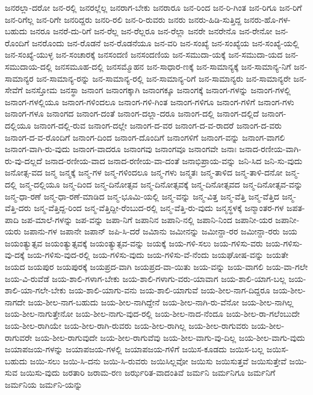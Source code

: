 {ಜನರಲ್ಲಾ-ದರೋ
ಜನ-ರಲ್ಲಿ
ಜನರಲ್ಲೆಲ್ಲ
ಜನರಾಗ-ಬೇಕು
ಜನರಾರೂ
ಜನ-ರಿಂದ
ಜನ-ರಿ-ಗಿಂತ
ಜನ-ರಿಗೂ
ಜನ-ರಿಗೆ
ಜನ-ರಿಗೆಲ್ಲ
ಜನ-ರಿಗೇ
ಜನರಿದ್ದರು
ಜನರಿ-ರಲಿ
ಜನ-ರಿ-ರುವರು
ಜನರು
ಜನರು-ಹಿಡಿ-ಸುತ್ತಿದ್ದ
ಜನರು-ಹೊ-ಗಳ-ಬಹುದು
ಜನರೂ
ಜನರೆ-ದು-ರಿಗೆ
ಜನ-ರೆಲ್ಲ
ಜನ-ರೆಲ್ಲರೂ
ಜನ-ರೆಲ್ಲಾ
ಜನರೇ
ಜನರೇನೊ
ಜನ-ರೇನೋ
ಜನ-ರೊಂದಿಗೆ
ಜನರೊಂದು
ಜನ-ರೊಡನೆ
ಜನ-ರೊಡನೆಯೂ
ಜನ-ವರಿ
ಜನ-ಸಂಖ್ಯೆ
ಜನ-ಸಂಖ್ಯೆಯ
ಜನ-ಸಂಖ್ಯೆ-ಯಲ್ಲಿ
ಜನ-ಸಂಖ್ಯೆ-ಯುಳ್ಳ
ಜನ-ಸಂಚಾರಕ್ಕೆ
ಜನಸಂದಣಿ
ಜನಸಂದಣಿಯ
ಜನ-ಸಮುದಾ-ಯಕ್ಕೆ
ಜನ-ಸಮುದಾ-ಯದ
ಜನ-ಸಮುದಾಯ-ದಲ್ಲಿ
ಜನಸಮೂಹ-ದಲ್ಲಿ
ಜನಸಮ್ಮೊಹನ
ಜನ-ಸಾಧಾರ-ಣಕ್ಕೆ
ಜನ-ಸಾಮಾನ್ಯಕ್ಕೆ
ಜನ-ಸಾಮಾನ್ಯ-ನಿಗೆ
ಜನ-ಸಾಮಾನ್ಯರ
ಜನ-ಸಾಮಾನ್ಯ-ರನ್ನು
ಜನ-ಸಾಮಾನ್ಯ-ರಲ್ಲಿ
ಜನ-ಸಾಮಾನ್ಯ-ರಿಗೆ
ಜನ-ಸಾಮಾನ್ಯರು
ಜನ-ಸಾಮಾನ್ಯರೇ
ಜನ-ಸೇವೆಗೆ
ಜನಸ್ತೋಮ
ಜನಸ್ಥಾ
ಜನಾಂಗ
ಜನಾಂಗಕ್ಕಾಗಿ
ಜನಾಂಗಕ್ಕೂ
ಜನಾಂಗಕ್ಕೆ
ಜನಾಂಗ-ಗಳನ್ನು
ಜನಾಂಗ-ಗಳಲ್ಲಿ
ಜನಾಂಗ-ಗಳಲ್ಲಿಯೂ
ಜನಾಂಗ-ಗಳಿಂದಲೂ
ಜನಾಂಗ-ಗಳಿ-ಗಿಂತ
ಜನಾಂಗ-ಗಳಿಗೂ
ಜನಾಂಗ-ಗಳಿಗೆ
ಜನಾಂಗ-ಗಳು
ಜನಾಂಗ-ಗಳೂ
ಜನಾಂಗದ
ಜನಾಂಗ-ದಂತೆ
ಜನಾಂಗ-ದಲ್ಲಾ-ದರೂ
ಜನಾಂಗ-ದಲ್ಲಿ
ಜನಾಂಗ-ದಲ್ಲಿದೆ
ಜನಾಂಗ-ದಲ್ಲಿಯೂ
ಜನಾಂಗ-ದಲ್ಲಿ-ರುವ
ಜನಾಂಗ-ದಲ್ಲೇ
ಜನಾಂಗ-ದ-ವರ
ಜನಾಂಗ-ದ-ವ-ರಾದರೆ
ಜನಾಂಗ-ದ-ವರು
ಜನಾಂಗ-ದ-ವ-ರೊಂದಿಗೆ
ಜನಾಂಗ-ದಿಂದ
ಜನಾಂಗ-ದೊಂದಿಗೆ
ಜನಾಂಗಳಿಗೆ
ಜನಾಂಗ-ವನ್ನು
ಜನಾಂಗ-ವಾಗಲಿ
ಜನಾಂಗ-ವಾಗಿ-ರು-ವುದು
ಜನಾಂಗ-ವಾದರೂ
ಜನಾಂಗವು
ಜನಾಂಗವೂ
ಜನಾಂಗವೇ
ಜನಾಃ
ಜನಾದ-ರಣೀಯ-ವಾಗಿ-ರು-ವು-ದಲ್ಲದೆ
ಜನಾದ-ರಣೀಯ-ವಾದ
ಜನಾದ-ರಣೀಯ-ವಾ-ದಂತೆ
ಜನಾಭಿಪ್ರಾಯ-ವನ್ನು
ಜನಿ-ಸಿದ
ಜನಿ-ಸು-ವುದು
ಜನೋತ್ಸ-ವದ
ಜನ್ಮ
ಜನ್ಮಕ್ಕೆ
ಜನ್ಮ-ಗಳ
ಜನ್ಮ-ಗಳಿಂದಲೂ
ಜನ್ಮ-ಗಳು
ಜನ್ಮತಃ
ಜನ್ಮ-ತಾಳಿದ
ಜನ್ಮ-ತಾಳಿ-ದನೋ
ಜನ್ಮ-ದಲ್ಲಿ
ಜನ್ಮ-ದಲ್ಲಿಯೂ
ಜನ್ಮ-ದಿಂದ
ಜನ್ಮ-ದಿನೋತ್ಸವ
ಜನ್ಮ-ದಿನೋತ್ಸವಕ್ಕೆ
ಜನ್ಮ-ದಿನೋತ್ಸವದ
ಜನ್ಮ-ದಿನೋತ್ಸವ-ವನ್ನು
ಜನ್ಮ-ಧಾ-ರಣೆ
ಜನ್ಮ-ಧಾ-ರಣೆ-ಮಾಡಿದ
ಜನ್ಮ-ಭೂಮಿ-ಯಲ್ಲಿ
ಜನ್ಮ-ವನ್ನು
ಜನ್ಮ-ವಿತ್ತ
ಜನ್ಮ-ವೆತ್ತಿ
ಜನ್ಮ-ವೆತ್ತಿದ
ಜನ್ಮ-ವೆತ್ತಿ-ದರು
ಜನ್ಮ-ವೆತ್ತಿದ್ದ-ರಿಂದ
ಜನ್ಮ-ವೆತ್ತಿದ್ದೀ-ರೆಂಬುದ-ರಲ್ಲಿ
ಜನ್ಮ-ವೆತ್ತಿ-ರು-ವುದು
ಜನ್ಮಸ್ಥಳಕ್ಕೆ
ಜನ್ಮಾಂತರ-ಗಳ
ಜಪತ-ಪಾದಿ
ಜಪ-ಮಾಲೆ-ಗಳನ್ನು
ಜಪ-ವನ್ನು
ಜಪಾ-ನಿಗೆ
ಜಪಾನಿನ
ಜಪಾನಿ-ನಲ್ಲಿ
ಜಪಾನಿ-ನಿಂದ
ಜಪಾನೀ-ಯರ
ಜಪಾನೀ-ಯರು
ಜಪಾನು-ಗಳ
ಜಪಾನೇ
ಜಪಾನ್
ಜಪಿ-ಸಿ-ದರೆ
ಜಮಿಾನು
ಜಮೀನನ್ನು
ಜಮೀನ್ದಾ-ರರ
ಜಮೀನ್ದಾ-ರರು
ಜಯ
ಜಯಂತ್ಯುತ್ಸವ
ಜಯಂತ್ಯುತ್ಸವಕ್ಕೆ
ಜಯಂತ್ಯುತ್ಸವ-ವನ್ನು
ಜಯಕ್ಕೆ
ಜಯ-ಗಳಿ-ಸಲು
ಜಯ-ಗಳಿಸು-ವರು
ಜಯ-ಗಳಿಸು-ವು-ದಕ್ಕೆ
ಜಯ-ಗಳಿಸು-ವುದ-ರಲ್ಲಿ
ಜಯ-ಗಳಿಸು-ವುದು
ಜಯ-ಗಳಿಸು-ವೆ-ನೆಂದು
ಜಯಘೋಷ-ವನ್ನು
ಜಯತೇ
ಜಯದ
ಜಯಪುರ
ಜಯಪುರಕ್ಕೆ
ಜಯಪ್ರದ-ವಾಗಿ
ಜಯಪ್ರದ-ವಾ-ಯಿತು
ಜಯ-ವನ್ನು
ಜಯ-ವಾಗಲಿ
ಜಯ-ವಾ-ಗಲೇ
ಜಯ-ವಿ-ರುವೆಡೆ
ಜಯ-ಶಾಲಿ-ಗಳಾಗ-ಬೇಕು
ಜಯ-ಶಾಲಿ-ಗಳಾಗು-ವರು-ಯಾವಾಗ
ಜಯ-ಶಾಲಿ-ಯಾಗ-ಬಲ್ಲ
ಜಯ-ಶಾಲಿ-ಯಾ-ಗಲೇ-ಬೇಕು
ಜಯ-ಶಾಲಿ-ಯಾಗು-ವನು
ಜಯ-ಶಾಲಿ-ಯಾಗುವೆ
ಜಯ-ಶೀಲ-ನಾಗ-ದಿದ್ದರೂ
ಜಯ-ಶೀಲ-ನಾಗದೇ
ಜಯ-ಶೀಲ-ನಾಗ-ಬಹುದು
ಜಯ-ಶೀಲ-ನಾಗಿದ್ದೇನೆ
ಜಯ-ಶೀಲ-ನಾಗಿ-ರು-ವೆನೋ
ಜಯ-ಶೀಲ-ನಾಗಿಲ್ಲ
ಜಯ-ಶೀಲ-ನಾಗುತ್ತೇನೋ
ಜಯ-ಶೀಲ-ನಾಗು-ವುದ-ರಲ್ಲಿ
ಜಯ-ಶೀಲ-ನಾದ-ನೆಂದೂ
ಜಯ-ಶೀಲ-ರಾ-ಗಲೆಂಬುದೇ
ಜಯ-ಶೀಲ-ರಾಗಿಯೇ
ಜಯ-ಶೀಲ-ರಾಗಿ-ರುವರು
ಜಯ-ಶೀಲ-ರಾಗಿಲ್ಲ
ಜಯ-ಶೀಲ-ರಾಗುವರು
ಜಯ-ಶೀಲ-ರಾಗುವರೇ
ಜಯ-ಶೀಲ-ರಾಗುವುದೇ
ಜಯ-ಶೀಲ-ರಾಗುವೆವು
ಜಯ-ಶೀಲ-ವಾಗು-ವು-ದಿಲ್ಲ
ಜಯ-ಶೀಲ-ವಾಗು-ವುದು
ಜಯಾಪಜಯ-ಗಳನ್ನು
ಜಯಾಪಜಯ-ಗಳಲ್ಲಿ
ಜಯಾಪಜಯ-ಗಳಿಗೆ
ಜಯಿಸ-ಕೂಡದು
ಜಯಿಸ-ಬಲ್ಲ
ಜಯಿಸ-ಬಹುದು
ಜಯಿ-ಸಲು
ಜಯಿ-ಸಿ-ದನು
ಜಯಿ-ಸಿ-ರುವರು
ಜಯಿಸಿಲ್ಲವೋ
ಜಯಿಸು
ಜಯಿಸುತ್ತವೆ
ಜಯಿಸುತ್ತೇವೆ
ಜಯಿ-ಸುವ
ಜಯಿಸು-ವುದು
ಜರತಾರಿ
ಜರಾಮ-ರಣ
ಜರ್ಝರಿತ-ವಾದಂತಿವೆ
ಜರ್ಮನಿ
ಜರ್ಮನಿಗೂ
ಜರ್ಮನಿಗೆ
ಜರ್ಮನಿಯ
ಜರ್ಮನಿ-ಯನ್ನು
}
